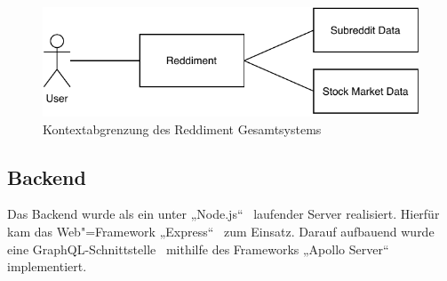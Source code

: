 \documentclass[a4paper, 10pt, conference]{IEEEtran}
\begin{document}
\begin{figure}[ht]
	\centering
	\includegraphics[width=\linewidth]{context}
	\caption{Kontextabgrenzung des Reddiment Gesamtsystems}
	\label{fig:context}
\end{figure}

\subsection{Backend} \label{sub:backend}
Das Backend wurde als ein unter „Node.js“~\cite{node} laufender Server realisiert. Hierfür kam das Web"=Framework „Express“~\cite{express} zum Einsatz. Darauf aufbauend wurde eine GraphQL-Schnittstelle~\cite{graphql} mithilfe des Frameworks „Apollo Server“~\cite{apolloserver} implementiert.

\end{document}
